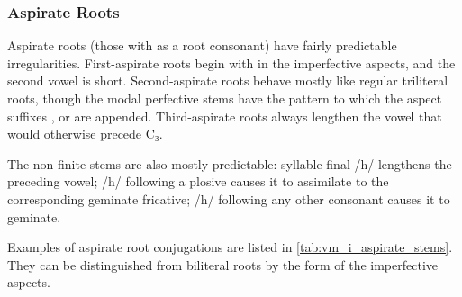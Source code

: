 \documentclass[grammar]{subfiles}
\begin{document}
\subsubsection{Aspirate Roots}
\label{sssec:vm_i_aspirate}

Aspirate roots (those with  as a root consonant) have fairly predictable
irregularities.  First-aspirate roots begin with  in the imperfective
aspects, and the second vowel is short.  Second-aspirate roots behave mostly like
regular triliteral roots, though the modal perfective stems have the pattern
 to which the aspect suffixes ,  or  are appended.
Third-aspirate roots always lengthen the vowel that would otherwise precede C₃.  

The non-finite stems are also mostly predictable: syllable-final /h/ lengthens the
preceding vowel; /h/ following a plosive causes it to assimilate to the
corresponding geminate fricative; /h/ following any other consonant causes it
to geminate. 

Examples of aspirate root conjugations are listed in
\cref{tab:vm_i_aspirate_stems}.  They can be distinguished from biliteral roots
by the form of the imperfective aspects. 
\end{document}

